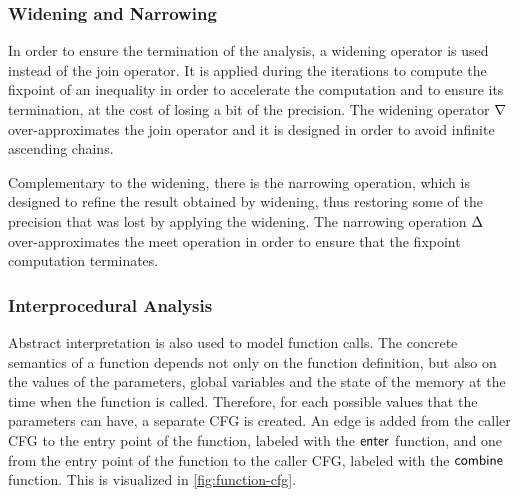 \subsubsection{Widening and Narrowing}

In order to ensure the termination of the analysis, a widening operator is used instead of the
join operator. It is applied during the iterations to compute the fixpoint of an inequality
in order to accelerate the computation and to ensure its termination, at the cost of losing a bit of the precision.
The widening operator $\nabla$ over-approximates the join operator and it is designed in order to avoid infinite ascending chains.

Complementary to the widening, there is the narrowing operation, which is designed to
refine the result obtained by widening, thus restoring some of the precision that was lost by applying the widening.
The narrowing operation $\Delta$ over-approximates the meet operation in order to ensure that the fixpoint computation terminates.

\subsubsection{Interprocedural Analysis}

Abstract interpretation is also used to model function calls.
The concrete semantics of a function depends not only on the function definition, but also on the values of the parameters, global variables and the state of the memory at the time when the function is called.
Therefore, for each possible values that the parameters can have, a separate CFG is created.
An edge is added from the caller CFG to the entry point of the function, labeled with the $\textsf{enter}$ function, and one from the entry point
of the function to the caller CFG, labeled with the $\textsf{combine}$ function.
This is visualized in \cref{fig:function-cfg}.

